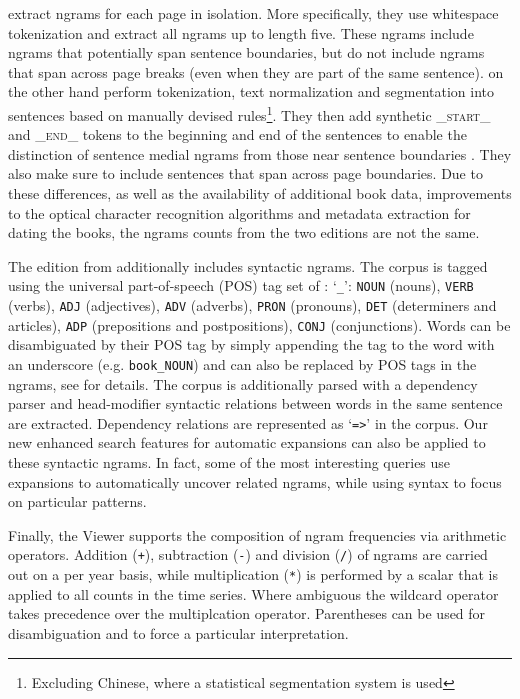 \documentclass[11pt,a4paper]{article}
\newcommand{\query}[1]{\texttt{#1}}
\begin{document}
 extract ngrams for each page in isolation. More specifically, they use whitespace tokenization and extract all ngrams up to length five. These ngrams include ngrams that potentially span sentence boundaries, but do not include ngrams that span across page breaks (even when they are part of the same sentence).
 on the other hand perform tokenization, text normalization and segmentation into sentences based on manually devised rules\footnote{Excluding Chinese, where a statistical segmentation system is used}. They then add synthetic \textsf{\textsc{\_start\_}} and \textsf{\textsc{\_end\_}} tokens to the beginning and end of the sentences to enable the distinction of sentence medial ngrams from those near sentence boundaries \cite{lin2012syntactic}. They also make sure to include sentences that span across page boundaries. Due to these differences, as well as the availability of additional book data, improvements to the optical character recognition algorithms and metadata extraction for dating the books, the ngrams counts from the two editions are not the same.

The edition from  additionally includes syntactic ngrams. The corpus is tagged using the universal part-of-speech (POS) tag set of : `\query{\_}': \query{NOUN} (nouns), \query{VERB} (verbs), \query{ADJ} (adjectives), \query{ADV} (adverbs), \query{PRON} (pronouns), \query{DET} (determiners and articles), \query{ADP} (prepositions and postpositions), \query{CONJ} (conjunctions). Words can be disambiguated by their POS tag by simply appending the tag to the word with an underscore (e.g. \texttt{book\_NOUN}) and can also be replaced by POS tags in the ngrams, see  for details. The corpus is additionally parsed with a dependency parser and head-modifier syntactic relations between words in the same sentence are extracted. Dependency relations are represented as `\query{=>}' in the corpus. Our new enhanced search features for automatic expansions can also be applied to these syntactic ngrams. In fact, some of the most interesting queries use expansions to automatically uncover related ngrams, while using syntax to focus on particular patterns.

Finally, the Viewer supports the composition of ngram frequencies via arithmetic operators. Addition (\query{+}), subtraction (\query{-}) and division (\query{/}) of ngrams are carried out on a per year basis, while multiplication (\query{*}) is performed by a scalar that is applied to all counts in the time series. Where ambiguous the wildcard operator takes precedence over the multiplcation operator. Parentheses can be used for disambiguation and to force a particular interpretation.
\end{document}
